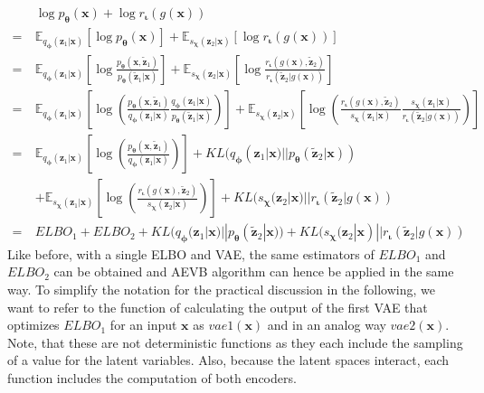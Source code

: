 \documentclass[12pt]{report}
\theoremstyle{definition}
\begin{document}
\begin{equation}
\begin{split}
 & \log p_{\pmb{\theta}}(\mathbf{x}) + \log r_{\mathbf{\iota}}(g(\mathbf{x}))   \\
	= \ & \mathbb{E}_{q_{\pmb{\phi}}(\mathbf{z}_1|\mathbf{x})}\left[\log p_{\pmb{\theta}}(\mathbf{x})\right] + \mathbb{E}_{s_{\mathbf{\chi}}(\mathbf{z}_2|\mathbf{x})}\left[\log r_{\mathbf{\iota}}(g(\mathbf{x}))\right] \\
	= \ & \mathbb{E}_{q_{\pmb{\phi}}(\mathbf{z}_1|\mathbf{x})}\left[ \log \frac{p_{\pmb{\theta}}(\mathbf{x}, \tilde{\mathbf{z}}_1)}{p_{\pmb{\theta}}(\tilde{\mathbf{z}}_1|\mathbf{x})} \right]
	+ \mathbb{E}_{s_{\mathbf{\chi}}(\mathbf{z}_2|\mathbf{x})}\left[ \log \frac{r_{\mathbf{\iota}}(g(\mathbf{x}), \tilde{\mathbf{z}}_2)}{r_{\mathbf{\iota}}(\tilde{\mathbf{z}}_2|g(\mathbf{x}))} \right] \\
	= \ & \mathbb{E}_{q_{\pmb{\phi}}(\mathbf{z}_1|\mathbf{x})}\left[ \log \left( \frac{p_{\pmb{\theta}}(\mathbf{x}, \tilde{\mathbf{z}}_1)}{q_{\pmb{\phi}}(\mathbf{z}_1|\mathbf{x})}\frac{q_{\pmb{\phi}}(\mathbf{z}_1|\mathbf{x})}{p_{\pmb{\theta}}(\tilde{\mathbf{z}}_1|\mathbf{x})}\right) \right]
	+ \mathbb{E}_{s_{\mathbf{\chi}}(\mathbf{z}_2|\mathbf{x})}\left[ \log \left( \frac{r_{\mathbf{\iota}}(g(\mathbf{x}), \tilde{\mathbf{z}}_2)}{s_{\mathbf{\chi}}(\mathbf{z}_1|\mathbf{x})}\frac{s_{\mathbf{\chi}}(\mathbf{z}_1|\mathbf{x})}{r_{\mathbf{\iota}}(\tilde{\mathbf{z}}_2|g(\mathbf{x}))} \right) \right] \\
	= \ & \mathbb{E}_{q_{\pmb{\phi}}(\mathbf{z}_1|\mathbf{x})}\left[ \log\left(\frac{p_{\pmb{\theta}}(\mathbf{x}, \tilde{\mathbf{z}}_1)}{q_{\pmb{\phi}}(\mathbf{z}_1|\mathbf{x})}\right) \right] + KL(q_{\pmb{\phi}}(\mathbf{z}_1|\mathbf{x}) || p_{\pmb{\theta}}(\tilde{\mathbf{z}}_2| \mathbf{x})) \\
	& + \mathbb{E}_{s_{\mathbf{\chi}}(\mathbf{z}_1|\mathbf{x})}\left[ \log\left(\frac{r_{\mathbf{\iota}}(g(\mathbf{x}), \tilde{\mathbf{z}}_2)}{s_{\mathbf{\chi}}(\mathbf{z}_2|\mathbf{x})}\right) \right] + KL(s_{\mathbf{\chi}}(\mathbf{z}_2|\mathbf{x}) || r_{\mathbf{\iota}}(\tilde{\mathbf{z}}_2| g(\mathbf{x})) \\
= \ & ELBO_1 + ELBO_2 + KL(q_{\pmb{\phi}}(\mathbf{z}_1|\mathbf{x}) || p_{\pmb{\theta}}(\tilde{\mathbf{z}}_2| \mathbf{x})) + KL(s_{\mathbf{\chi}}(\mathbf{z}_2|\mathbf{x}) || r_{\mathbf{\iota}}(\tilde{\mathbf{z}}_2| g(\mathbf{x}))
\end{split}
\end{equation}
Like before, with a single ELBO and VAE, the same estimators of $ELBO_1$ and $ELBO_2$ can be obtained and AEVB algorithm can hence be applied in the same way. To simplify the notation for the practical discussion in the following, we want to refer to the function of calculating the output of the first VAE that optimizes $ELBO_1$ for an input $\mathbf{x}$ as $vae1(\mathbf{x})$ and in an analog way $vae2(\mathbf{x})$. Note, that these are not deterministic functions as they each include the sampling of a value for the latent variables. Also, because the latent spaces interact, each function includes the computation of both encoders.
\end{document}
